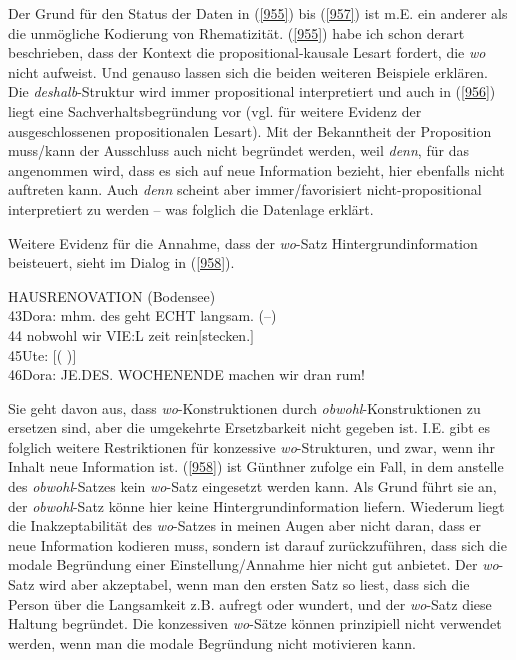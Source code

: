 {Der Grund für den Status der Daten in (\ref{955}) bis (\ref{957}) ist m.E. ein anderer als die unmögliche Kodierung von Rhematizität. (\ref{955}) habe ich schon derart beschrieben, dass der Kontext die propositional-kausale Lesart fordert, die \textit{wo} nicht aufweist. Und genauso lassen sich die beiden weiteren Beispiele erklären. Die \textit{deshalb}-Struktur wird immer propositional interpretiert und auch in (\ref{956}) liegt eine Sachverhaltsbegründung vor (vgl. \citealt[143]{Pasch1999} für weitere Evidenz der ausgeschlossenen propositionalen Lesart). Mit der Bekanntheit der Proposition muss/kann der Ausschluss auch nicht begründet werden, weil \textit{denn}, für das angenommen wird, dass es sich auf neue Information bezieht, hier ebenfalls nicht auftreten kann. Auch \textit{denn} scheint aber immer/favorisiert nicht-propositional interpretiert zu werden – was folglich die Datenlage erklärt.

Weitere Evidenz für die Annahme, dass der \textit{wo}-Satz Hintergrundinformation beisteuert, sieht \citet{Guenthner2002} im Dialog in (\ref{958}).

\begin{exe}
	\ex\label{958} HAUSRENOVATION (Bodensee)\\
	43Dora: mhm. des geht ECHT langsam. (–)\\
	44 \hspace{0.5cm}nobwohl wir VIE:L zeit rein$[$stecken.$]$\\
	45Ute:\hspace{0.5cm}			         $[$(           )$]$\\
	46Dora: JE.DES. WOCHENENDE machen wir dran rum! 
	\newline	 				      
	\hbox{}\hfill\hbox{\citet[331]{Guenthner2002}}
\end{exe}
Sie geht davon aus, dass \textit{wo}-Konstruktionen durch \textit{obwohl}-Konstruktionen zu ersetzen sind, aber die umgekehrte Ersetzbarkeit nicht gegeben ist. I.E. gibt es folg\-lich weitere Restriktionen für konzessive \textit{wo}-Strukturen, und zwar, wenn ihr Inhalt neue Information ist. (\ref{958}) ist Günthner zufolge ein Fall, in dem anstelle des \textit{obwohl}-Satzes kein \textit{wo}-Satz eingesetzt werden kann. Als Grund führt sie an, der \textit{obwohl}-Satz könne hier keine Hintergrundinformation liefern. Wiederum liegt die Inakzeptabilität des \textit{wo}-Satzes in meinen Augen aber nicht daran, dass er neue Information kodieren muss, sondern ist darauf zurückzuführen, dass sich die modale Begründung einer Einstellung/Annahme hier nicht gut anbietet. Der \textit{wo}-Satz wird aber akzeptabel, wenn man den ersten Satz so liest, dass sich die Person über die Langsamkeit z.B. aufregt oder wundert, und der \textit{wo}-Satz diese Haltung begründet. Die \glq konzessiven\grq {} \textit{wo}-Sätze können prinzipiell nicht verwendet werden, wenn man die modale Begründung nicht motivieren kann.

}

